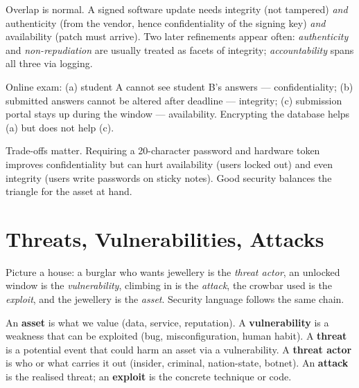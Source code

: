 Overlap is normal. A signed software update needs integrity (not tampered) \emph{and} authenticity (from the vendor, hence confidentiality of the signing key) \emph{and} availability (patch must arrive). Two later refinements appear often: \emph{authenticity} and \emph{non-repudiation} are usually treated as facets of integrity; \emph{accountability} spans all three via logging.

\begin{example}
Online exam: (a) student A cannot see student B's answers --- confidentiality; (b) submitted answers cannot be altered after deadline --- integrity; (c) submission portal stays up during the window --- availability. Encrypting the database helps (a) but does not help (c).
\end{example}

Trade-offs matter. Requiring a 20-character password and hardware token improves confidentiality but can hurt availability (users locked out) and even integrity (users write passwords on sticky notes). Good security balances the triangle for the asset at hand.

\section{Threats, Vulnerabilities, Attacks}
\label{sec:threats}
Picture a house: a burglar who wants jewellery is the \emph{threat actor}, an unlocked window is the \emph{vulnerability}, climbing in is the \emph{attack}, the crowbar used is the \emph{exploit}, and the jewellery is the \emph{asset}. Security language follows the same chain.

\begin{definition}
An \textbf{asset} is what we value (data, service, reputation). A \textbf{vulnerability} is a weakness that can be exploited (bug, misconfiguration, human habit). A \textbf{threat} is a potential event that could harm an asset via a vulnerability. A \textbf{threat actor} is who or what carries it out (insider, criminal, nation-state, botnet). An \textbf{attack} is the realised threat; an \textbf{exploit} is the concrete technique or code.
\end{definition}

